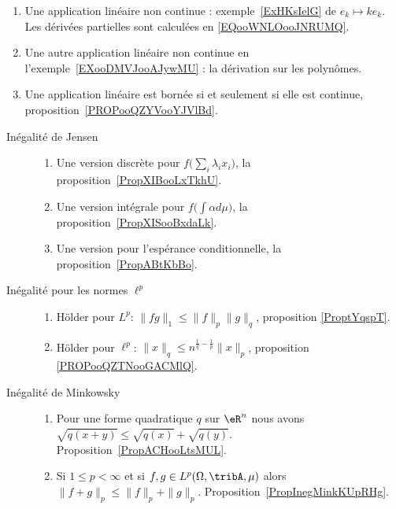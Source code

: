        \label{THEMEooYCBUooEnFdUg}
\begin{enumerate}
    \item
        Une application linéaire non continue : exemple~\ref{ExHKsIelG} de \( e_k\mapsto ke_k\). Les dérivées partielles sont calculées en \eqref{EQooWNLOooJNRUMQ}.
    \item
        Une autre application linéaire non continue en l'exemple~\ref{EXooDMVJooAJywMU} : la dérivation sur les polynômes.
    \item
        Une application linéaire est bornée si et seulement si elle est continue, proposition~\ref{PROPooQZYVooYJVlBd}.
\end{enumerate}


\begin{description}
    \item[Inégalité de Jensen]
        \begin{enumerate}
            \item
                Une version discrète pour \( f\big( \sum_i\lambda_ix_i \big)\), la proposition~\ref{PropXIBooLxTkhU}.
            \item
                Une version intégrale pour \( f\big( \int \alpha d\mu \big)\), la proposition~\ref{PropXISooBxdaLk}.
            \item
                Une version pour l'espérance conditionnelle, la proposition~\ref{PropABtKbBo}.
        \end{enumerate}
    \item[Inégalité pour les normes $ \ell^p$]
        \begin{enumerate}
            \item
                Hölder pour \( L^p\): \( \| fg \|_1\leq \| f \|_p\| g \|_q\), proposition \ref{ProptYqspT}.
            \item
                Hölder pour \( \ell^p\): \( \| x \|_q\leq n^{\frac{1}{ q }-\frac{1}{ p }}\| x \|_p\), proposition \ref{PROPooQZTNooGACMlQ}.
        \end{enumerate}
    \item[Inégalité de Minkowsky]
        \begin{enumerate}
            \item
                Pour une forme quadratique \( q\) sur \( \eR^n\) nous avons $\sqrt{q(x+y)}\leq\sqrt{q(x)}+\sqrt{q(y)}$. Proposition~\ref{PropACHooLtsMUL}.
            \item
                Si \( 1\leq p<\infty\) et si \( f,g\in L^p(\Omega,\tribA,\mu)\) alors \(  \| f+g \|_p\leq \| f \|_p+\| g \|_p\). Proposition~\ref{PropInegMinkKUpRHg}.

\end{enumerate}
\end{description}
